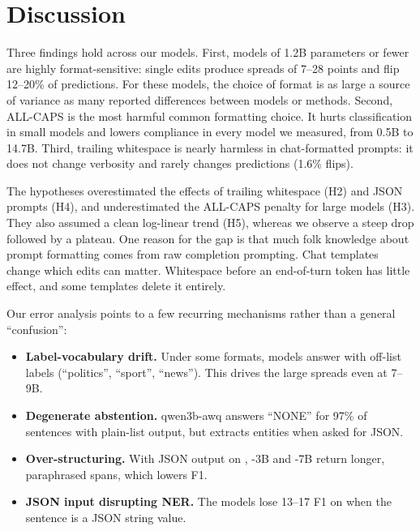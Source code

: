 \section{Discussion}
\label{sec:discussion}

 Three findings hold across our models. First, models of 1.2B parameters or fewer are highly format-sensitive: single edits produce spreads of 7--28 points and flip 12--20\% of predictions. For these models, the choice of format is as large a source of variance as many reported differences between models or methods. Second, ALL-CAPS is the most harmful common formatting choice. It hurts classification in small \qwen models and lowers \ifeval compliance in every model we measured, from 0.5B to 14.7B. Third, trailing whitespace is nearly harmless in chat-formatted prompts: it does not change verbosity and rarely changes predictions (1.6\% flips).

 The hypotheses overestimated the effects of trailing whitespace (H2) and JSON prompts (H4), and underestimated the ALL-CAPS penalty for large models (H3). They also assumed a clean log-linear trend (H5), whereas we observe a steep drop followed by a plateau. One reason for the gap is that much folk knowledge about prompt formatting comes from raw completion prompting. Chat templates change which edits can matter. Whitespace before an end-of-turn token has little effect, and some templates delete it entirely.

 Our error analysis points to a few recurring mechanisms rather than a general ``confusion'':
\begin{itemize}[leftmargin=*,itemsep=0pt,topsep=0pt]
    \item {\bf Label-vocabulary drift.} Under some formats, models answer with off-list labels (``politics'', ``sport'', ``news''). This drives the large \agnews spreads even at 7--9B.
    \item {\bf Degenerate abstention.} qwen3b-awq answers ``NONE'' for 97\% of \conll sentences with plain-list output, but extracts entities when asked for JSON.
    \item {\bf Over-structuring.} With JSON output on \squad, \qwen-3B and \qwen-7B return longer, paraphrased spans, which lowers F1.
    \item {\bf JSON input disrupting NER.} The \llama models lose 13--17 F1 on \conll when the sentence is a JSON string value.
\end{itemize}

